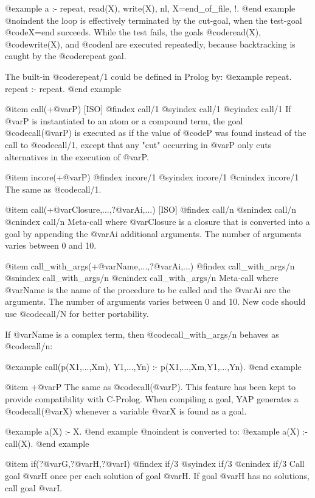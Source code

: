{{{{@example
 a :- repeat, read(X), write(X), nl, X=end_of_file, !.
@end example
@noindent
the loop is effectively terminated by the cut-goal, when the test-goal
@code{X=end} succeeds. While the test fails, the goals @code{read(X)},
@code{write(X)}, and @code{nl} are executed repeatedly, because
backtracking is caught by the @code{repeat} goal.

The built-in @code{repeat/1} could be defined in Prolog by:
@example
 repeat.
 repeat :- repeat.
@end example

@item call(+@var{P}) [ISO]
@findex call/1
@syindex call/1
@cyindex call/1
 If @var{P} is instantiated to an atom or a compound term, the goal
@code{call(@var{P})} is executed as if the value of @code{P} was found
instead of the call to @code{call/1}, except that any "cut" occurring in
@var{P} only cuts alternatives in the execution of @var{P}.

@item incore(+@var{P})
@findex incore/1
@syindex incore/1
@cnindex incore/1
The same as @code{call/1}.

@item call(+@var{Closure},...,?@var{Ai},...) [ISO]
@findex call/n
@snindex call/n
@cnindex call/n
Meta-call where @var{Closure} is a closure that is converted into a goal by 
appending the @var{Ai} additional arguments. The number of arguments varies 
between 0 and 10.

@item call_with_args(+@var{Name},...,?@var{Ai},...)
@findex call_with_args/n
@snindex call_with_args/n
@cnindex call_with_args/n
Meta-call where @var{Name} is the name of the procedure to be called and
the @var{Ai} are the arguments. The number of arguments varies between 0
and 10. New code should use @code{call/N} for better portability.

If @var{Name} is a complex term, then @code{call_with_args/n} behaves as
@code{call/n}:

@example
call(p(X1,...,Xm), Y1,...,Yn) :- p(X1,...,Xm,Y1,...,Yn).
@end example


@item +@var{P}
 The same as @code{call(@var{P})}. This feature has been kept to provide
compatibility with C-Prolog. When compiling a goal, YAP
generates a @code{call(@var{X})} whenever a variable @var{X} is found as
a goal.

@example
 a(X) :- X.
@end example
@noindent
is converted to:
@example
 a(X) :- call(X).
@end example

@item if(?@var{G},?@var{H},?@var{I})
@findex if/3
@syindex if/3
@cnindex if/3
Call goal @var{H} once per each solution of goal @var{H}. If goal
@var{H} has no solutions, call goal @var{I}.

}}}}
